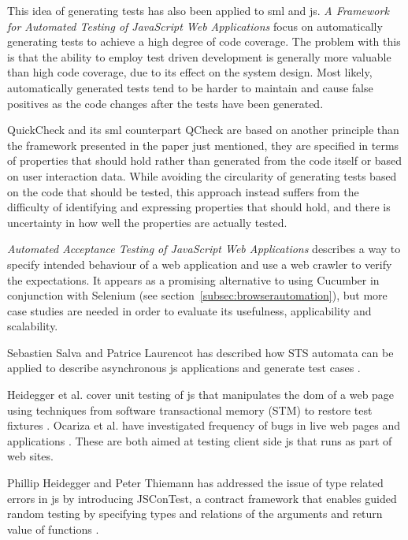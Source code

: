 \documentclass[11pt]{article}
\begin{document}
This idea of generating tests has also been applied to \gls{sml} and \gls{js}. \emph{A Framework for Automated Testing of JavaScript Web Applications} \cite{AutomatedTesting} focus on automatically generating tests to achieve a high degree of code coverage. The problem with this is that the ability to employ test driven development is generally more valuable than high code coverage, due to its effect on the system design. Most likely, automatically generated tests tend to be harder to maintain and cause false positives as the code changes after the tests have been generated.

QuickCheck and its \gls{sml} counterpart QCheck are based on another principle than the framework presented in the paper just mentioned, they are specified in terms of properties that should hold rather than generated from the code itself or based on user interaction data. While avoiding the circularity of generating tests based on the code that should be tested, this approach instead suffers from the difficulty of identifying and expressing properties that should hold, and there is uncertainty in how well the properties are actually tested.

\emph{Automated Acceptance Testing of JavaScript Web Applications} \cite{AutomatedAcceptance} describes a way to specify intended behaviour of a web application and use a web crawler to verify the expectations. It appears as a promising alternative to using Cucumber in conjunction with Selenium (see section~\ref{subsec:browserautomation}), but more case studies are needed in order to evaluate its usefulness, applicability and scalability. %

Sebastien Salva and Patrice Laurencot has described how STS automata can be applied to describe asynchronous \gls{js} applications and generate test cases \cite{AutomatedAjax}.

Heidegger et al. cover unit testing of \gls{js} that manipulates the \gls{dom} of a web page using techniques from software transactional memory (STM) to restore test fixtures \cite{DOMJavascript}. Ocariza et al. have investigated frequency of bugs in live web pages and applications \cite{Wild}. These are both aimed at testing client side \gls{js} that runs as part of web sites.

Phillip Heidegger and Peter Thiemann has addressed the issue of type related errors in \gls{js} by introducing JSConTest, a contract framework that enables guided random testing by specifying types and relations of the arguments and return value of functions \cite{ContractTesting}.
\end{document}
